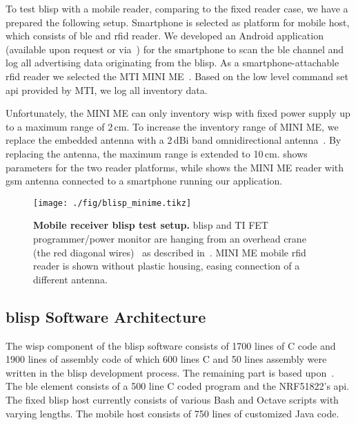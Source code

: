 \documentclass[conference,letterpaper,twoside,final,10pt]{IEEEtran}
\begin{document}
To test \ac{blisp} with a mobile reader, comparing to the fixed reader case, we have a prepared the following setup.
Smartphone is selected as platform for mobile host, which consists of \ac{ble} and \ac{rfid} reader.
We developed an Android application (available upon request or via~\cite{blisp2015repo}) for the smartphone to scan the \ac{ble} channel and log all advertising data originating from the \ac{blisp}.
As a smartphone-attachable \ac{rfid} reader we selected the MTI MINI ME~\cite{mti2015minime}. Based on the low level command set \ac{api} provided by MTI, we log all inventory data.

Unfortunately, the MINI ME can only inventory \ac{wisp} with fixed power supply up to a maximum range of 2\,\si{\centi\metre}.
To increase the inventory range of MINI ME, we replace the embedded antenna with a 2\,\si{dBi}  band omnidirectional antenna~\cite{adafruit2015antenna}.
By replacing the antenna, the maximum range is extended to 10\,\si{\centi\metre}.
 shows parameters for the two reader platforms, while
 shows the MINI ME reader with \ac{gsm} antenna connected to a smartphone running our application.

\begin{figure}
	\centering
	\texttt{[image: ./fig/blisp\_minime.tikz]}
	\caption{\textbf{Mobile receiver \ac{blisp} test setup.}
	\ac{blisp} and TI FET programmer/power monitor are hanging from an overhead crane (the red diagonal wires)~\cite{catani2015gondola} as described in~.
	MINI ME mobile \ac{rfid} reader is shown without plastic housing, easing connection of a different antenna.
	}
	\label{fig:minime_experiment}
\end{figure}

\subsection{\acs{blisp} Software Architecture}
\label{sec:blisp_software}

The \ac{wisp} component of the \ac{blisp} software consists of 1700 lines of C code and 1900 lines of assembly code of which 600 lines C and 50 lines assembly were written in the \ac{blisp} development process. The remaining part is based upon~\cite{github2015wisp5}.
The \ac{ble} element consists of a 500 line C coded program and the NRF51822's \ac{api}.
The fixed \ac{blisp} host currently consists of various Bash and Octave scripts with varying lengths.
The mobile host consists of 750 lines of customized Java code.
\end{document}
